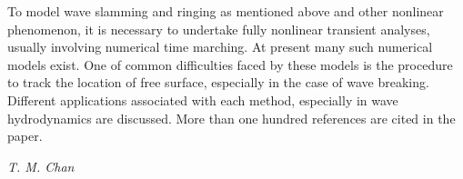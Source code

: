 \begin{preface}
To model wave slamming and ringing as mentioned above and other
nonlinear phenomenon, it is necessary to undertake fully nonlinear
transient analyses, usually involving numerical time marching. At
present many such numerical models exist. One of common difficulties
faced by these models is the procedure to track the location of free
surface, especially in the case of wave breaking. Different
applications associated with each method, especially in wave
hydrodynamics are discussed. More than one hundred references are
cited in the paper.

\begin{flushright}
{\it T. M. Chan}
\end{flushright}
\end{preface}
